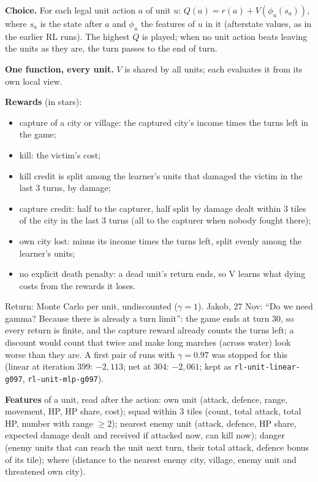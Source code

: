 \documentclass{../polyexp}
\begin{document}
\textbf{Choice.} For each legal unit action $a$ of unit $u$: $Q(a) = r(a) + V(\phi_u(s_a))$, where $s_a$ is the state
after $a$ and $\phi_u$ the features of $u$ in it (afterstate values, as in the earlier RL runs). The highest $Q$ is
played; when no unit action beats leaving the units as they are, the turn passes to the end of turn.

\textbf{One function, every unit.} $V$ is shared by all units; each evaluates it from its own local view.

\textbf{Rewards} (in stars):
\begin{itemize}
  \item capture of a city or village: the captured city's income times the turns left in the game;
  \item kill: the victim's cost;
  \item kill credit is split among the learner's units that damaged the victim in the last 3 turns, by damage;
  \item capture credit: half to the capturer, half split by damage dealt within 3 tiles of the city in the last 3
        turns (all to the capturer when nobody fought there);
  \item own city lost: minus its income times the turns left, split evenly among the learner's units;
  \item no explicit death penalty: a dead unit's return ends, so V learns what dying costs from the rewards it loses.
\end{itemize}
Return: Monte Carlo per unit, undiscounted ($\gamma = 1$). Jakob, 27 Nov: ``Do we need gamma? Because there is already a
turn limit'': the game ends at turn 30, so every return is finite, and the capture reward already counts the turns
left; a discount would count that twice and make long marches (across water) look worse than they are. A first pair of
runs with $\gamma = 0.97$ was stopped for this (linear at iteration 399: $-2{,}113$; net at 304: $-2{,}061$; kept as
\texttt{rl-unit-linear-g097}, \texttt{rl-unit-mlp-g097}).

\textbf{Features} of a unit, read after the action:
own unit (attack, defence, range, movement, HP, HP share, cost);
squad within 3 tiles (count, total attack, total HP, number with range $\geq 2$);
nearest enemy unit (attack, defence, HP share, expected damage dealt and received if attacked now, can kill now);
danger (enemy units that can reach the unit next turn, their total attack, defence bonus of its tile);
where (distance to the nearest enemy city, village, enemy unit and threatened own city).
\end{document}
